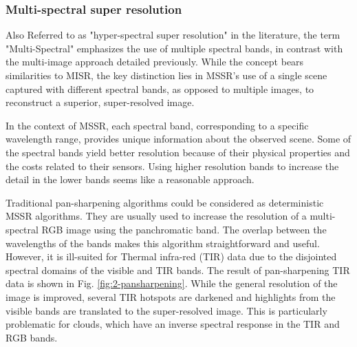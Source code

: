         \subsubsection{Multi-spectral super resolution}

        Also Referred to as "hyper-spectral super resolution" in the literature, the term "Multi-Spectral" emphasizes the use of multiple spectral bands, in contrast with the multi-image approach detailed previously. While the concept bears similarities to MISR, the key distinction lies in MSSR's use of a single scene captured with different spectral bands, as opposed to multiple images, to reconstruct a superior, super-resolved image.

        In the context of MSSR, each spectral band, corresponding to a specific wavelength range, provides unique information about the observed scene. Some of the spectral bands yield better resolution because of their physical properties and the costs related to their sensors. Using higher resolution bands to increase the detail in the lower bands seems like a reasonable approach.

        Traditional pan-sharpening algorithms could be considered as deterministic MSSR  algorithms. They are usually used to increase the resolution of a multi-spectral RGB image using the panchromatic band. The overlap between the wavelengths of the bands makes this algorithm straightforward and useful. However, it is ill-suited for Thermal infra-red (TIR) data due to the disjointed spectral domains of the visible and TIR bands.
        The result of pan-sharpening TIR data is shown in Fig. \ref{fig:2-pansharpening}.  While the general resolution of the image is improved, several TIR hotspots are darkened and highlights from the visible bands are translated to the super-resolved image. This is particularly problematic for clouds, which have an inverse spectral response in the TIR and RGB bands. 
        
